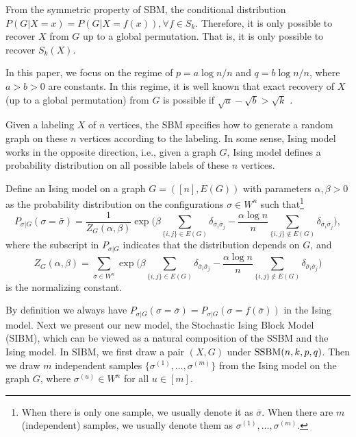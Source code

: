 \documentclass{article}
\begin{document}
	From the symmetric property of SBM, the conditional distribution $P(G|X=x) = P(G|X=f(x)), \forall f \in S_k$. Therefore, it is only possible to recover $X$ from $G$ up to a global permutation. That is, it is only possible to recover $S_k(X)$.

In this paper, we focus on the regime of $p=a\log n/n$ and $q=b\log n/n$, where $a>b> 0$ are constants. In this regime, it is well known that exact recovery of $X$ (up to a global permutation) from $G$ is possible if $\sqrt{a}-\sqrt{b} > \sqrt{k}$ \cite{abbe2015community}.

Given a labeling $X$ of $n$ vertices, the SBM specifies how to generate a random graph on these $n$ vertices according to the labeling. In some sense, Ising model works in the opposite direction, i.e., given a graph $G$, Ising model defines a probability distribution on all possible labels of these $n$ vertices. 

 \begin{definition}
Define an Ising model on a graph $G=([n],E(G))$ with parameters $\alpha,\beta>0$ as the probability distribution on the configurations $\sigma\in W^n$ such that\footnote{When there is only one sample, we usually denote it as $\bar{\sigma}$. When there are $m$ (independent) samples, we usually denote them as $\sigma^{(1)},\dots,\sigma^{(m)}$.}
\begin{equation} \label{eq:isingma}
P_{\sigma|G}(\sigma=\bar{\sigma})=\frac{1}{Z_G(\alpha,\beta)}
\exp\Big(\beta\sum_{\{i,j\}\in E(G)} \delta_{\bar{\sigma}_i \bar{\sigma}_j}
-\frac{\alpha\log n}{n} \sum_{\{i,j\}\notin E(G)} \delta_{\bar{\sigma}_i \bar{\sigma}_j} \Big),
\end{equation}
where the subscript in $P_{\sigma|G}$ indicates that the distribution depends on $G$, and 
\begin{equation}  \label{eq:zg}
Z_G(\alpha,\beta)=\sum_{\bar{\sigma} \in W^n} \exp\Big(\beta\sum_{\{i,j\}\in E(G)}\delta_{\bar{\sigma}_i \bar{\sigma}_j} 
-\frac{\alpha\log n}{n} \sum_{\{i,j\}\notin E(G)} \delta_{\bar{\sigma}_i \bar{\sigma}_j}  \Big) 
\end{equation}
is the normalizing constant.
\end{definition}






By definition we always have $P_{\sigma|G}(\sigma=\bar{\sigma})=P_{\sigma|G}(\sigma=f(\bar{\sigma}))$ in the Ising model. Next we present our new model, the Stochastic Ising Block Model (SIBM), which can be viewed as a natural composition of the SSBM and the Ising model. In SIBM, we first draw a pair $(X,G)$ under $\operatorname{SSBM}(n,k, p,q)$.  Then we draw $m$ independent samples $\{\sigma^{(1)},\dots,\sigma^{(m)}\}$ from the Ising model on the graph $G$, where $\sigma^{(u)}\in W^n$ for all $u\in[m]$.
\end{document}
